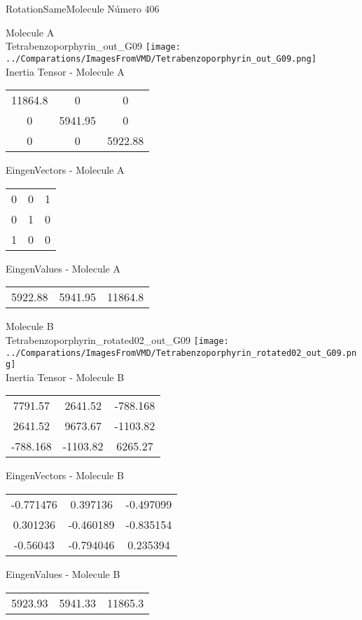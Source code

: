  \newpage

\vtab[-2cm]
\begin{center}
{\large RotationSameMolecule \tab Número 406}
\end{center}
\begin{multicols}{2}
\begin{center}

Molecule A \\ 
Tetrabenzoporphyrin\_out\_G09
\texttt{[image: ../Comparations/ImagesFromVMD/Tetrabenzoporphyrin\_out\_G09.png]}
\\
Inertia Tensor - Molecule A \\
\vtab

\begin{tabular}{|c c c|}
11864.8	 & 	0	 & 	0	 \\
0	 & 	5941.95	 & 	0	 \\
0	 & 	0	 & 	5922.88
\end{tabular}

\vtab
 EingenVectors - Molecule A     \\
\vtab
\begin{tabular}{|c c c|}
0	 & 	0	 & 	1	 \\
0	 & 	1	 & 	0	 \\
1	 & 	0	 & 	0
\end{tabular}

\vtab
 EingenValues - Molecule A     \\
\vtab
\begin{tabular}{|c c c|}
5922.88	 & 	5941.95	 & 	11864.8	 \\
\end{tabular}
\columnbreak

Molecule B \\ 
Tetrabenzoporphyrin\_rotated02\_out\_G09
\texttt{[image: ../Comparations/ImagesFromVMD/Tetrabenzoporphyrin\_rotated02\_out\_G09.png]}
\\
Inertia Tensor - Molecule B \\
\vtab

\begin{tabular}{|c c c|}
7791.57	 & 	2641.52	 & 	-788.168	 \\
2641.52	 & 	9673.67	 & 	-1103.82	 \\
-788.168	 & 	-1103.82	 & 	6265.27
\end{tabular}

\vtab
 EingenVectors - Molecule B     \\
\vtab
\begin{tabular}{|c c c|}
-0.771476	 & 	0.397136	 & 	-0.497099	 \\
0.301236	 & 	-0.460189	 & 	-0.835154	 \\
-0.56043	 & 	-0.794046	 & 	0.235394
\end{tabular}

\vtab
 EingenValues - Molecule B     \\
\vtab
\begin{tabular}{|c c c|}
5923.93	 & 	5941.33	 & 	11865.3	 \\
\end{tabular}

\end{center}
\end{multicols}
